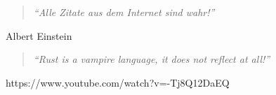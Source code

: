 
\thispagestyle{empty}

\vspace*{\fill}

\begin{center}
	\begin{minipage}{.75\textwidth}
		\begin{quotation}
			\textit{\enquote{Alle Zitate aus dem Internet sind wahr!}}
		\end{quotation}
		\hfill \textsf{Albert Einstein}
	\end{minipage}
\end{center}


\begin{center}
	\begin{minipage}{.75\textwidth}
		\begin{quotation}
			\textit{\enquote{Rust is a vampire language, it does not reflect at all!}}
		\end{quotation}
		\hfill \textsf{https://www.youtube.com/watch?v=-Tj8Q12DaEQ}
	\end{minipage}
\end{center}


